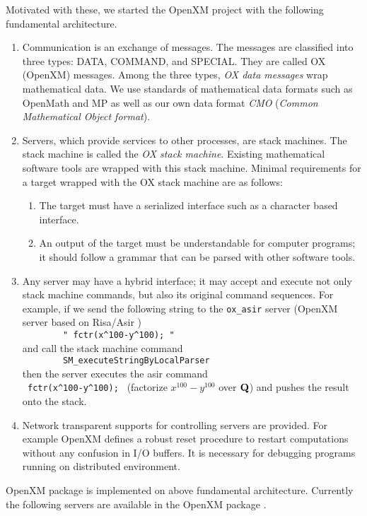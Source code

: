 Motivated with these, we started the OpenXM project with the following
fundamental architecture.
\begin{enumerate}
\item Communication is an exchange of messages. The messages are classified into
three types:
DATA, COMMAND, and SPECIAL.
They are called OX (OpenXM) messages.
Among the three types,
{\it OX data messages} wrap mathematical data.
We use standards of mathematical data formats such as OpenMath and MP
as well as our own data format {\it CMO}
({\it Common Mathematical Object format}).
\item Servers, which provide services to other processes, are stack machines.
The stack machine is called the
{\it OX stack machine}.
Existing mathematical software tools are wrapped with this stack machine.
Minimal requirements for a target wrapped with the OX stack machine
are as follows:
\begin{enumerate}
\item The target must have a serialized interface such as a character based
interface.
\item An output of the target must be understandable for computer programs;
it should follow a grammar that can be parsed with other software tools.
\end{enumerate}
\item Any server may have a hybrid interface;
it may accept and execute not only stack machine commands, 
but also its original command sequences.
For example,
if we send the following string to the {\tt ox\_asir} server 
(OpenXM server based on Risa/Asir \cite{asir}) \\
\verb+        " fctr(x^100-y^100); "      + \\
and call the stack machine command  \\
\verb+        SM_executeStringByLocalParser    + \\ 
then the server executes the asir command \\
\verb+ fctr(x^100-y^100); + 
(factorize $x^{100}-y^{100}$ over ${\bf Q}$)
and pushes the result onto the stack.
\item Network transparent supports for controlling servers are provided.
For example OpenXM defines a robust reset procedure to restart computations
without any confusion in I/O buffers.
It is necessary for debugging programs running on distributed environment.
\end{enumerate}
OpenXM package  is implemented on above fundamental architecture.
Currently the following servers are available in the OpenXM package
\cite{openxm-web}.

